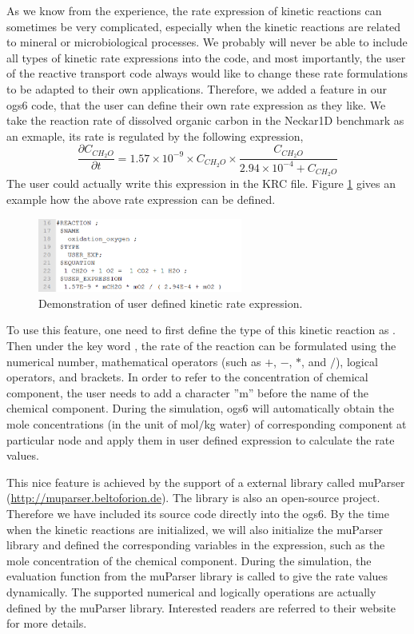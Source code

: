 As we know from the experience, the rate expression of kinetic reactions can sometimes be very complicated, especially when the kinetic reactions are related to mineral or microbiological processes. We probably will never be able to include all types of kinetic rate expressions into the code, and most importantly, the user of the reactive transport code always would like to change these rate formulations to be adapted to their own applications. Therefore, we added a feature in our ogs6 code, that the user can define their own rate expression as they like. We take the reaction rate of dissolved organic carbon in the Neckar1D benchmark as an exmaple, its rate is regulated by the following expression, 
\begin{equation}
\frac{\partial C_{CH_2O}}{\partial t} = 1.57 \times 10^{-9} \times C_{CH_2O} \times \frac{C_{CH_2O}}{2.94 \times 10^{-4} + C_{CH_2O}}
\end{equation}
The user could actually write this expression in the KRC file.  Figure \ref{fig:RT_fig_user_exp} gives an example how the above rate expression can be defined. 

\begin{figure}
\includegraphics[width=0.6\textwidth]{RT/figs/RT_fig_user_exp}
\caption{Demonstration of user defined kinetic rate expression. }
\label{fig:RT_fig_user_exp}
\end{figure}

To use this feature, one need to first define the type of this kinetic reaction as . Then under the key word , the rate of the reaction can be formulated using the numerical number, mathematical operators (such as $+$, $-$, $*$, and $/$), logical operators, and brackets. In order to refer to the concentration of chemical component, the user needs to add a character ''m'' before the name of the chemical component. During the simulation, ogs6 will automatically obtain the mole concentrations (in the unit of mol$\slash$kg water) of corresponding component at particular node and apply them in user defined expression to calculate the rate values. 

This nice feature is achieved by the support of a external library called muParser (\url{http://muparser.beltoforion.de}). The library is also an open-source project. Therefore we have included its source code directly into the ogs6. By the time when the kinetic reactions are initialized, we will also initialize the muParser library and defined the corresponding variables in the expression, such as the mole concentration of the chemical component. During the simulation, the evaluation function from the muParser library is called to give the rate values dynamically. The supported numerical and logically operations are actually defined by the muParser library. Interested readers are referred to their website for more details. 

